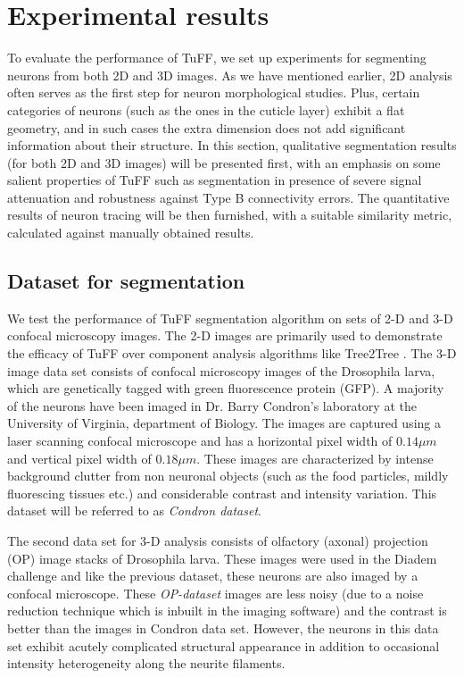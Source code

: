\section{Experimental results}
To evaluate the performance of TuFF, we set up experiments for segmenting neurons from both 2D and 3D images. As we have mentioned earlier, 2D analysis often serves as the first step for neuron morphological studies. Plus, certain categories of neurons (such as the ones in the cuticle layer) exhibit a flat geometry, and in such cases the extra dimension does not add significant information about their structure. In this section, qualitative segmentation results (for both 2D and 3D images) will be presented first, with an emphasis on some salient properties of TuFF such as segmentation in presence of severe signal attenuation and robustness against Type B connectivity errors. The quantitative results of neuron tracing will be then furnished, with a suitable similarity metric, calculated against manually obtained results.

\subsection{Dataset for segmentation}
We test the performance of TuFF segmentation algorithm on sets of 2-D and 3-D confocal microscopy images. The 2-D images are primarily used to demonstrate the efficacy of TuFF over component analysis algorithms like Tree2Tree \cite{basu_T2T_journal}. The 3-D image data set consists of confocal microscopy images of the Drosophila larva, which are genetically tagged with green fluorescence protein (GFP). A majority of the neurons have been imaged in Dr. Barry Condron's laboratory at the University of Virginia, department of Biology.   The images are captured using a laser scanning confocal microscope and has a horizontal pixel width of $0.14 \mu m$ and vertical pixel width of $0.18 \mu m$. These images are characterized by intense background clutter from non neuronal objects (such as the food particles, mildly fluorescing tissues etc.) and considerable contrast and intensity variation. This dataset will be referred to as \textit{Condron dataset}.

The second data set for 3-D analysis consists of olfactory (axonal) projection (OP) image stacks of Drosophila larva. These images were used in the Diadem challenge \cite{diadem_dataset} and like the previous dataset, these neurons are also imaged by a confocal microscope. These \textit{OP-dataset} images are less noisy (due to a noise reduction technique which is inbuilt in the imaging software) and the contrast is better than the images in Condron data set. However, the neurons in this data set exhibit acutely complicated structural appearance in addition to occasional intensity heterogeneity along the neurite filaments.

